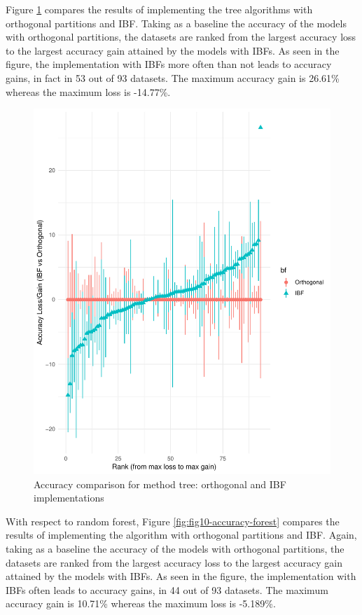 \documentclass[]{elsarticle} %
\makeatletter
\def\maxwidth{\ifdim\Gin@nat@width>\linewidth\linewidth
\else\Gin@nat@width\fi}
\let\Oldincludegraphics\includegraphics
\renewcommand{\includegraphics}[1]{\Oldincludegraphics[width=\maxwidth]{#1}}
\makeatother
\begin{document}
Figure \ref{fig:fig9-accuracy-tree} compares the results of implementing
the tree algorithms with orthogonal partitions and IBF. Taking as a
baseline the accuracy of the models with orthogonal partitions, the
datasets are ranked from the largest accuracy loss to the largest
accuracy gain attained by the models with IBFs. As seen in the figure,
the implementation with IBFs more often than not leads to accuracy
gains, in fact in 53 out of 93 datasets. The maximum accuracy gain is
26.61\% whereas the maximum loss is -14.77\%.

\begin{figure}[htbp]
\centering
\includegraphics{Trees_with_Base_Functions_v2_files/figure-latex/fig9-accuracy-tree-1.pdf}
\caption{\label{fig:fig9-accuracy-tree}Accuracy comparison for method
tree: orthogonal and IBF implementations}
\end{figure}

With respect to random forest, Figure \ref{fig:fig10-accuracy-forest}
compares the results of implementing the algorithm with orthogonal
partitions and IBF. Again, taking as a baseline the accuracy of the
models with orthogonal partitions, the datasets are ranked from the
largest accuracy loss to the largest accuracy gain attained by the
models with IBFs. As seen in the figure, the implementation with IBFs
often leads to accuracy gains, in 44 out of 93 datasets. The maximum
accuracy gain is 10.71\% whereas the maximum loss is -5.189\%.
\end{document}
